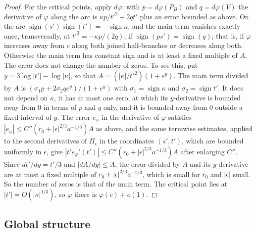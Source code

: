 \begin{proof}
For the critical points, apply $d\varphi$: with $p=d\varphi(P_B)$ and $q=d\varphi(V)$ the derivative of $\varphi$ along the arc
is $\kappa p/t'^2+2qt'$ plus an error bounded as above. On the arc $\operatorname{sign}(s')\operatorname{sign}(t')=-\operatorname{sign}\kappa$, and the
main term vanishes exactly once, transversally, at $t'^3=-\kappa p/(2q)$, if $\operatorname{sign}(p s')=\operatorname{sign}(q)$; that is, if
$\varphi$ increases away from $c$ along both joined half-branches or decreases along both. Otherwise the main term
has constant sign and is at least a fixed multiple of $A$. The error does not change the number of zeros. To see
this, put $y=3\log|t'|-\log|\kappa|$, so that $A=(|\kappa|/t'^2)(1+e^y)$. The main term divided by $A$ is
$(\sigma_1p+2\sigma_2qe^y)/(1+e^y)$ with $\sigma_1=\operatorname{sign}\kappa$ and $\sigma_2=\operatorname{sign}t'$. It does not depend on $\kappa$, it has at
most one zero, at which its $y$-derivative is bounded away from $0$ in terms of $p$ and $q$ only, and it is bounded away
from $0$ outside a fixed interval of $y$. The error $e_\varphi$ in the derivative of $\varphi$ satisfies
$|e_\varphi|\le C''(r_0+|\epsilon|^{2/3}a^{-1/3})A$ as above, and the same termwise estimates, applied to the second
derivatives of $\Pi_\epsilon$ in the coordinates $(s',t')$, which are bounded uniformly in $\epsilon$, give
$|t'e_\varphi'(t')|\le C''(r_0+|\epsilon|^{2/3}a^{-1/3})A$ after enlarging $C''$. Since $dt'/dy=t'/3$ and $|dA/dy|\le A$, the error
divided by $A$ and its $y$-derivative are at most a fixed multiple of $r_0+|\epsilon|^{2/3}a^{-1/3}$, which is small for $r_0$
and $|\epsilon|$ small. So the number of zeros is that of the main term. The critical
point lies at $|t'|=O(|\kappa|^{1/3})$, so $\varphi$ there is $\varphi(c)+o(1)$.
\end{proof}

\subsection{Global structure}


